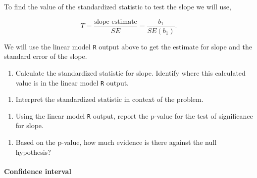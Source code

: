 \documentclass[
]{report}
\providecommand{\tightlist}{%
  \setlength{\itemsep}{0pt}\setlength{\parskip}{0pt}}
\begin{document}
To find the value of the standardized statistic to test the slope we will use,

\[
T = \frac{\mbox{slope estimate}}{SE} = \frac{b_1}{SE(b_1)}.
\]

We will use the linear model \texttt{R} output above to get the estimate for slope and the standard error of the slope.

\newpage

\begin{enumerate}
\def\labelenumi{\arabic{enumi}.}
\setcounter{enumi}{6}
\tightlist
\item
  Calculate the standardized statistic for slope. Identify where this calculated value is in the linear model \texttt{R} output.
\end{enumerate}

\vspace{1in}

\begin{enumerate}
\def\labelenumi{\arabic{enumi}.}
\setcounter{enumi}{7}
\tightlist
\item
  Interpret the standardized statistic in context of the problem.
\end{enumerate}

\vspace{0.8in}

\begin{enumerate}
\def\labelenumi{\arabic{enumi}.}
\setcounter{enumi}{8}
\tightlist
\item
  Using the linear model \texttt{R} output, report the p-value for the test of significance for slope.
\end{enumerate}

\vspace{0.5in}

\begin{enumerate}
\def\labelenumi{\arabic{enumi}.}
\setcounter{enumi}{9}
\tightlist
\item
  Based on the p-value, how much evidence is there against the null hypothesis?
\end{enumerate}

\vspace{0.5in}

\hypertarget{confidence-interval-3}{%
\paragraph*{Confidence interval}\label{confidence-interval-3}}
\end{document}
